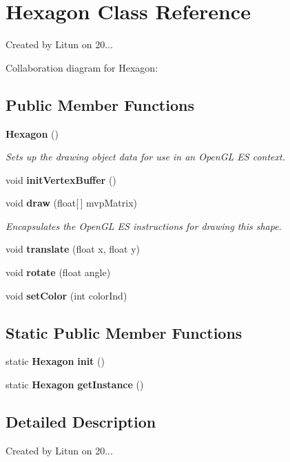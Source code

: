 \section{Hexagon Class Reference}
\label{classsf_1_1unitingtwist_1_1_hexagon}


Created by Litun on 20...  




Collaboration diagram for Hexagon\+:
\subsection*{Public Member Functions}
\begin{DoxyCompactItemize}
\item 
\textbf{ Hexagon} ()
\begin{DoxyCompactList}\small\item\em Sets up the drawing object data for use in an Open\+GL ES context. \end{DoxyCompactList}\item 
void \textbf{ init\+Vertex\+Buffer} ()
\item 
void \textbf{ draw} (float[$\,$] mvp\+Matrix)
\begin{DoxyCompactList}\small\item\em Encapsulates the Open\+GL ES instructions for drawing this shape. \end{DoxyCompactList}\item 
void \textbf{ translate} (float x, float y)
\item 
void \textbf{ rotate} (float angle)
\item 
void \textbf{ set\+Color} (int color\+Ind)
\end{DoxyCompactItemize}
\subsection*{Static Public Member Functions}
\begin{DoxyCompactItemize}
\item 
static \textbf{ Hexagon} \textbf{ init} ()
\item 
static \textbf{ Hexagon} \textbf{ get\+Instance} ()
\end{DoxyCompactItemize}


\subsection{Detailed Description}
Created by Litun on 20... 

